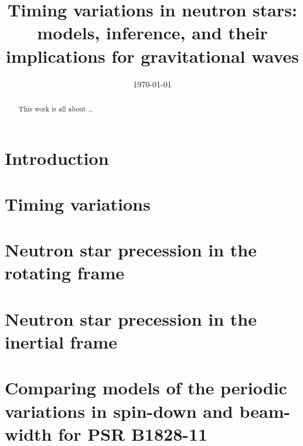 \documentclass[twoside]{thesis}
\begin{document}
\def\biblio{}

\frontmatter
\title      {Timing variations in neutron stars: models, inference, and their
             implications for gravitational waves}
\date       {\today}
\subject    {}
\keywords   {}
\maketitle
\begin{abstract}
This work is all about \dots
\end{abstract}
\tableofcontents


\mainmatter

\chapter{Introduction}
\label{sec: neutron star physics}


\chapter{Timing variations}
\label{sec: timing variations}


\chapter{Neutron star precession in the rotating frame}
\label{sec: rotating frame}


\chapter{Neutron star precession in the inertial frame}
\label{sec: inertial frame}


\chapter{Comparing models of the periodic variations in spin-down
and beam-width for PSR B1828-11}
\label{sec: testing models}

\end{document}
